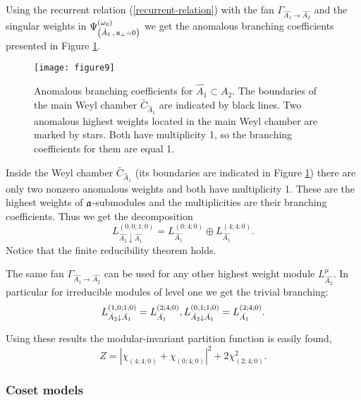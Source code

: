 Using the recurrent relation (\ref{recurrent-relation}) with the fan
$\Gamma_{\hat{A_1}\rightarrow \hat{A_2}}$ and the singular weights in
$\Psi ^{\left( \omega_0 \right) }_{\left(  \hat A_1\, , \, \mathfrak{a}_{\bot}=0 \right)}$
we get the anomalous branching coefficients presented
in Figure \ref{fig:AffineA2_A1_branching}.
\begin{figure}[h!tb]
  \centering
  \texttt{[image: figure9]}
  \caption{Anomalous branching coefficients for $\hat{A_1}\subset \hat{A_2}$. The boundaries
  of the main Weyl chamber $\bar{C}_{\hat{A}_1}$
 are indicated by black lines. Two anomalous highest weights located
 in the main Weyl chamber are marked by stars.
 Both have multiplicity 1, so the branching coefficients for them are equal 1.}
  \label{fig:AffineA2_A1_branching}
\end{figure}
Inside the Weyl chamber $\bar{C}_{\hat{A}_1}$
(its boundaries are indicated in Figure \ref{fig:AffineA2_A1_branching})
there are only two nonzero anomalous weights and both have multiplicity 1.
These are the highest weights of $\mathfrak{a}$-submodules and the multiplicities are their branching
coefficients. Thus we get the decomposition
\begin{equation*}
  \label{eq:43}
  L^{(0,0;1;0)}_{\hat{A_2}\downarrow \hat{A_1}}= L_{\hat{A_1}}^{(0;4;0)}\oplus L_{\hat{A_1}}^{(4;4;0)}.
\end{equation*}
Notice that the finite reducibility theorem holds.

The same fan $\Gamma_{\hat{A_1}\rightarrow \hat{A_2}}$ can be used for any other highest weight
module $L^{\mu}_{\hat{A_2}}$. In particular for irreducible modules of level one  we get the trivial
branching:
\begin{equation*}
  \label{eq:44}
   L^{(1,0;1;0)}_{\hat{A_2}\downarrow \hat{A_1}}= L_{\hat{A_1}}^{(2;4;0)},\\
   L^{(0,1;1;0)}_{\hat{A_2}\downarrow \hat{A_1}}= L_{\hat{A_1}}^{(2;4;0)}.
\end{equation*}

Using these results the modular-invariant partition function is easily found,
\begin{equation*}
  \label{eq:45}
  Z=\left|\chi_{(4;4;0)}+\chi_{(0;4;0)}\right|^2+2\chi_{(2;4;0)}^2.
\end{equation*}

\subsubsection{Coset models}
\label{sec:coset-models}

